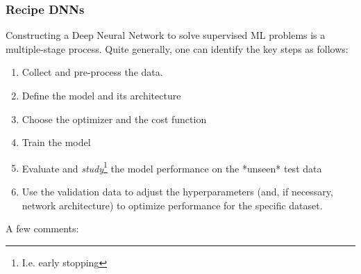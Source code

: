 \subsubsection{Recipe DNNs}
\label{subsubsec:dnnRecipe}
Constructing a Deep Neural Network to solve supervised ML problems is a multiple-stage process. Quite generally, one can identify the key steps as follows:
\begin{enumerate} 
	\item Collect and pre-process the data.
	\item  Define the model and its architecture
	\item  Choose the optimizer and the cost function
	\item  Train the model 
	\item  Evaluate and \emph{study}\footnote{I.e. early stopping} the model performance on the *unseen* test data
	\item Use the validation data to adjust the hyperparameters (and, if necessary, network architecture) to optimize performance for the specific dataset.
\end{enumerate}
A few comments:
